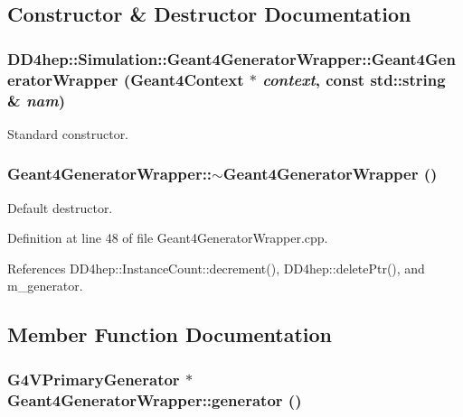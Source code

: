 \subsection{Constructor \& Destructor Documentation}
\hypertarget{class_d_d4hep_1_1_simulation_1_1_geant4_generator_wrapper_ac42334940d51e2bd7830429c64b77ced}{
\subsubsection[{Geant4GeneratorWrapper}]{\setlength{\rightskip}{0pt plus 5cm}DD4hep::Simulation::Geant4GeneratorWrapper::Geant4GeneratorWrapper ({\bf Geant4Context} $\ast$ {\em context}, \/  const std::string \& {\em nam})}}
\label{class_d_d4hep_1_1_simulation_1_1_geant4_generator_wrapper_ac42334940d51e2bd7830429c64b77ced}


Standard constructor. \hypertarget{class_d_d4hep_1_1_simulation_1_1_geant4_generator_wrapper_a6b3f7695a18e97d4aed0f414368ff84a}{
\subsubsection[{$\sim$Geant4GeneratorWrapper}]{\setlength{\rightskip}{0pt plus 5cm}Geant4GeneratorWrapper::$\sim$Geant4GeneratorWrapper ()}}
\label{class_d_d4hep_1_1_simulation_1_1_geant4_generator_wrapper_a6b3f7695a18e97d4aed0f414368ff84a}


Default destructor. 

Definition at line 48 of file Geant4GeneratorWrapper.cpp.

References DD4hep::InstanceCount::decrement(), DD4hep::deletePtr(), and m\_\-generator.

\subsection{Member Function Documentation}
\hypertarget{class_d_d4hep_1_1_simulation_1_1_geant4_generator_wrapper_a9185103e129d36edd74946ec77ef0b6b}{
\subsubsection[{generator}]{\setlength{\rightskip}{0pt plus 5cm}G4VPrimaryGenerator $\ast$ Geant4GeneratorWrapper::generator ()}}
\label{class_d_d4hep_1_1_simulation_1_1_geant4_generator_wrapper_a9185103e129d36edd74946ec77ef0b6b}


